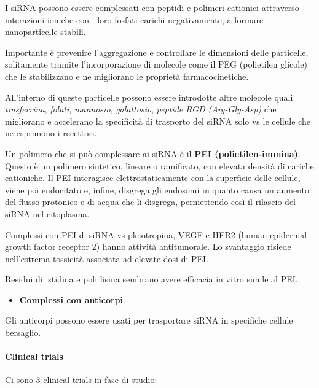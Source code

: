 \documentclass[]{article}
\begin{document}
I siRNA possono essere complessati con peptidi e polimeri cationici
attraverso interazioni ioniche con i loro fosfati carichi negativamente,
a formare nanoparticelle stabili.

Importante è prevenire l'aggregazione e controllare le dimensioni delle
particelle, solitamente tramite l'incorporazione di molecole come il PEG
(polietilen glicole) che le stabilizzano e ne migliorano le proprietà
farmacocinetiche.

All'interno di queste particelle possono essere introdotte altre
molecole quali \emph{trasferrina}, \emph{folati}, \emph{mannosio},
\emph{galattosio}, \emph{peptide RGD (Arg-Gly-Asp)} che migliorano e
accelerano la specificità di trasporto del siRNA solo vs le cellule che
ne esprimono i recettori.

Un polimero che si può complessare ai siRNA è il \textbf{PEI
(polietilen-immina)}. Questo è un polimero sintetico, lineare o
ramificato, con elevata densità di cariche cationiche. Il PEI
interagisce elettrostaticamente con la superficie delle cellule, viene
poi endocitato e, infine, disgrega gli endosomi in quanto causa un
aumento del flusso protonico e di acqua che li disgrega, permettendo
così il rilascio del siRNA nel citoplasma.

Complessi con PEI di siRNA vs pleiotropina, VEGF e HER2 (human epidermal
growth factor receptor 2) hanno attività antitumorale. Lo svantaggio
risiede nell'estrema tossicità associata ad elevate dosi di PEI.

Residui di istidina e poli lisina sembrano avere efficacia in vitro
simile al PEI.

\begin{itemize}
\itemsep1pt\parskip0pt
\item
  \textbf{Complessi con anticorpi}
\end{itemize}

Gli anticorpi possono essere usati per trasportare siRNA in specifiche
cellule bersaglio.

\paragraph{Clinical trials}\label{clinical-trials}

Ci sono 3 clinical trials in fase di studio:
\end{document}
